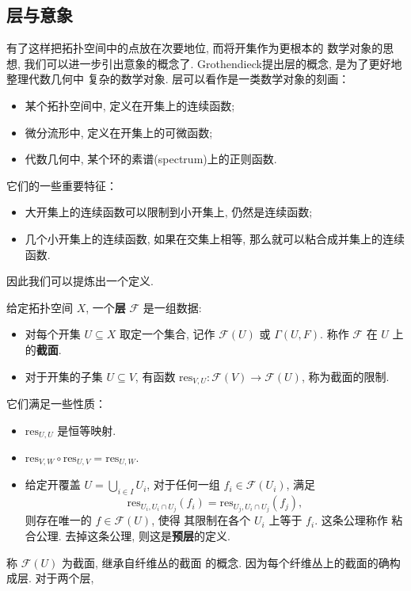 \subsection{层与意象}
有了这样把拓扑空间中的点放在次要地位, 而将开集作为更根本的
数学对象的思想, 我们可以进一步引出意象的概念了.
Grothendieck提出层的概念, 是为了更好地整理代数几何中
复杂的数学对象. 层可以看作是一类数学对象的刻画：
\begin{itemize}
\item 某个拓扑空间中, 定义在开集上的连续函数;
\item 微分流形中, 定义在开集上的可微函数;
\item 代数几何中, 某个环的素谱(spectrum)上的正则函数.~\cite[第二章, 例1.0.1]{hartshorne:1977:ag}
\end{itemize}
它们的一些重要特征：
\begin{itemize}
\item 大开集上的连续函数可以限制到小开集上, 仍然是连续函数;
\item 几个小开集上的连续函数, 如果在交集上相等, 那么就可以粘合成并集上的连续函数.
\end{itemize}
因此我们可以提炼出一个定义.
\begin{definition}
给定拓扑空间 \(X\), 一个\textbf{层} \(\mathscr F\) 是一组数据:
\begin{itemize}
\item 对每个开集 \(U \subseteq X\) 取定一个集合,
记作 \(\mathscr F(U)\) 或 \(\Gamma(U, F)\).
称作 \(\mathscr F\) 在 \(U\) 上的\textbf{截面}.
\item 对于开集的子集 \(U \subseteq V\), 有函数
\(\mathrm{res}_{V,U} : \mathscr F(V) \to \mathscr F(U)\),
称为截面的限制.
\end{itemize}
它们满足一些性质：
\begin{itemize}
\item \(\mathrm{res}_{U,U}\) 是恒等映射.
\item \(\mathrm{res}_{V, W}\circ \mathrm{res}_{U,V} = \mathrm{res}_{U, W}\).
\item 给定开覆盖 \(U = \bigcup_{i\in I} U_i\),
对于任何一组 \(f_i \in \mathscr F(U_i)\), 满足
\[\mathrm{res}_{U_i, U_i \cap U_j}(f_i)
= \mathrm{res}_{U_j, U_i \cap U_j}(f_j),\]
则存在唯一的 \(f \in \mathscr F(U)\), 使得
其限制在各个 \(U_i\) 上等于 \(f_i\). 这条公理称作
粘合公理. 去掉这条公理, 则这是\textbf{预层}的定义.
\end{itemize}
\end{definition}
称 \(\mathscr F(U)\) 为截面, 继承自纤维丛的截面
的概念. 因为每个纤维丛上的截面的确构成层. 对于两个层,
